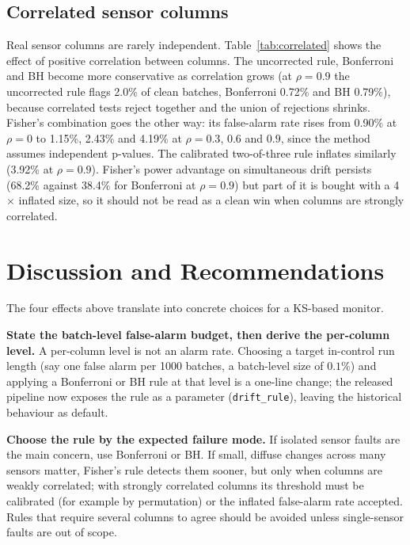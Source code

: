 \documentclass[11pt]{article}
\begin{document}
\subsection{Correlated sensor columns}

Real sensor columns are rarely independent. Table~\ref{tab:correlated} shows the effect of positive correlation between columns. The uncorrected rule, Bonferroni and BH become more conservative as correlation grows (at $\rho=0.9$ the uncorrected rule flags 2.0\% of clean batches, Bonferroni 0.72\% and BH 0.79\%), because correlated tests reject together and the union of rejections shrinks. Fisher's combination goes the other way: its false-alarm rate rises from 0.90\% at $\rho=0$ to 1.15\%, 2.43\% and 4.19\% at $\rho=0.3$, $0.6$ and $0.9$, since the method assumes independent p-values. The calibrated two-of-three rule inflates similarly (3.92\% at $\rho=0.9$). Fisher's power advantage on simultaneous drift persists (68.2\% against 38.4\% for Bonferroni at $\rho=0.9$) but part of it is bought with a 4$\times$ inflated size, so it should not be read as a clean win when columns are strongly correlated.

\begin{table}[htbp]
\centering
\small
\resizebox{\linewidth}{!}{}
\caption{Batches flagged (\%) when the three columns are correlated (equal pairwise correlation $\rho$), with no drift and with a $+0.25$ standard-deviation shift in every column.}
\label{tab:correlated}
\end{table}

\section{Discussion and Recommendations}

The four effects above translate into concrete choices for a KS-based monitor.

\textbf{State the batch-level false-alarm budget, then derive the per-column level.} A per-column level is not an alarm rate. Choosing a target in-control run length (say one false alarm per 1000 batches, a batch-level size of $0.1\%$) and applying a Bonferroni or BH rule at that level is a one-line change; the released pipeline now exposes the rule as a parameter (\texttt{drift\_rule}), leaving the historical behaviour as default.

\textbf{Choose the rule by the expected failure mode.} If isolated sensor faults are the main concern, use Bonferroni or BH. If small, diffuse changes across many sensors matter, Fisher's rule detects them sooner, but only when columns are weakly correlated; with strongly correlated columns its threshold must be calibrated (for example by permutation) or the inflated false-alarm rate accepted. Rules that require several columns to agree should be avoided unless single-sensor faults are out of scope.
\end{document}
